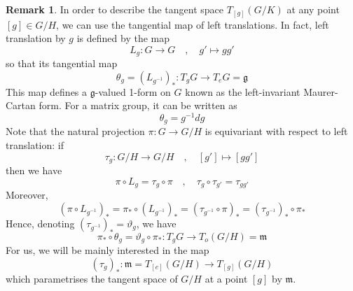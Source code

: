 \documentclass[a4paper,11pt]{article}
\theoremstyle{definition}
\newtheorem{remark}{Remark}
\newcommand{\g}{\mathfrak{g}}
\newcommand{\m}{\mathfrak{m}}
\begin{document}
\begin{remark}
  In order to describe the tangent space $T_{[g]}(G/K)$ at any point $[g] \in G/H$, we can use the tangential map of left translations. 
  In fact, left translation by $g$ is defined by the map
  \begin{equation}
    L_g \colon G \to G \quad , \quad g' \mapsto g g'
  \end{equation}
  so that its tangential map
  \begin{equation}
    \theta_g = (L_{g^{-1}})_* \colon T_g G \to T_e G = \g
  \end{equation}
  This map defines a $\g$-valued 1-form on $G$ known as the left-invariant Maurer-Cartan form. 
  For a matrix group, it can be written as 
  \begin{equation}
    \theta_g = g^{-1}dg
  \end{equation}
  Note that the natural projection $\pi \colon G \to G/H$ is equivariant with respect to left translation: if 
  \begin{equation}
    \tau_g \colon G/H \to G/H \quad , \quad [g'] \mapsto [gg']
  \end{equation}
  then we have
  \begin{equation}
    \pi \circ L_g = \tau_g \circ \pi \quad , \quad \tau_g\circ\tau_{g'} = \tau_{gg'}
  \end{equation}
  Moreover, 
  \begin{equation}
    (\pi\circ L_{g^{-1}})_* = \pi_* \circ (L_{g^{-1}})_* = (\tau_{g^{-1}} \circ \pi)_* = (\tau_{g^{-1}})_* \circ \pi_*
  \end{equation}
  Hence, denoting $(\tau_{g^{-1}})_* = \vartheta_g$, we have
  \begin{equation}
    \pi_* \circ \theta_g = \vartheta_g \circ \pi_* \colon T_g G \to T_{o}(G/H) = \m
  \end{equation}
  For us, we will be mainly interested in the map
  \begin{equation}
    (\tau_g)_* \colon \m = T_{[e]}(G/H) \to T_{[g]}(G/H)
  \end{equation}
  which parametrises the tangent space of $G/H$ at a point $[g]$ by $\m$.
\end{remark}
\end{document}

